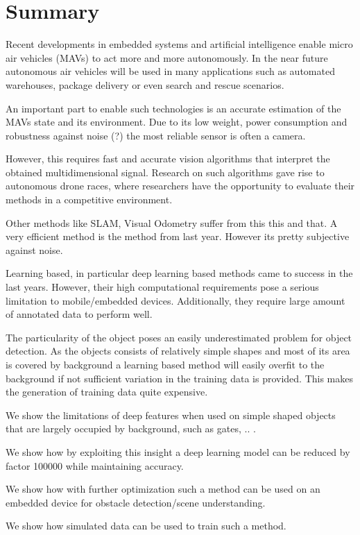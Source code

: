 \chapter*{Summary}

Recent developments in embedded systems and artificial intelligence enable micro air vehicles (MAVs) to act more and more autonomously. In the near future autonomous air vehicles will be used in many applications such as automated warehouses, package delivery or even search and rescue scenarios.

An important part to enable such technologies is an accurate estimation of the MAVs state and its environment. Due to its low weight, power consumption and robustness against noise (?) the most reliable sensor is often a camera. 

However, this requires fast and accurate vision algorithms that interpret the obtained multidimensional signal. Research on such algorithms gave rise to autonomous drone races, where researchers have the opportunity to evaluate their methods in a competitive environment.

Other methods like SLAM, Visual Odometry suffer from this this and that. A very efficient method is the method from last year. However its pretty subjective against noise.

Learning based, in particular deep learning based methods came to success in the last years. However, their high computational requirements pose a serious limitation to mobile/embedded devices. Additionally, they require large amount of annotated data to perform well.

The particularity of the object poses an easily underestimated problem for object detection. As the objects consists of relatively simple shapes and most of its area is covered by background a learning based method will easily overfit to the background if not sufficient variation in the training data is provided. This makes the generation of training data quite expensive.

We show the limitations of deep features when used on  simple shaped objects that are largely occupied by background, such as gates, .. .

We show how by exploiting this insight a deep learning model can be reduced by factor 100000 while maintaining accuracy.

We show how with further optimization such a method can be used on an embedded device for obstacle detection/scene understanding.

We show how simulated data can be used to train such a method.


